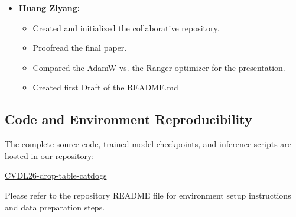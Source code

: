 \begin{itemize}
\begin{itemize}
\begin{itemize}
\begin{itemize}
                \item Supported the end-to-end evaluation and error analysis framework that contributed to securing the group's first-place challenge submission (73.28\%).
            \end{itemize}
            \item \textbf{Report \& Presentation:}
            \begin{itemize}
                \item Delivered presentation segments covering data acquisition, training setups, and the pretrained-vs-scratch comparison; produced corresponding training-curve and performance comparison figures.
                \item Cowrote the System Architecture, Classification Model, and Integration Findings part of the final paper in the experiments and Related Work section
                \item Published both pipeline editions (combined and species-split) as fully documented repositories and notebooks.
            \end{itemize}
        \end{itemize}
    \end{itemize}

    \item \textbf{Huang Ziyang:}
    \begin{itemize}
        \item Created and initialized the collaborative repository.
        \item Proofread the final paper.
        \item Compared the AdamW vs. the Ranger optimizer for the presentation.
        \item Created first Draft of the README.md
    \end{itemize}
\end{itemize}
%

\subsection{Code and Environment Reproducibility}
\label{sec:code_reproducibility}

The complete source code, trained model checkpoints, and inference scripts are hosted in our repository:
\begin{center}
    \href{https://github.com/NordlichtS/CVDL26-drop-table-catdogs}{CVDL26-drop-table-catdogs}
\end{center}
Please refer to the repository README file for environment setup instructions and data preparation steps.



